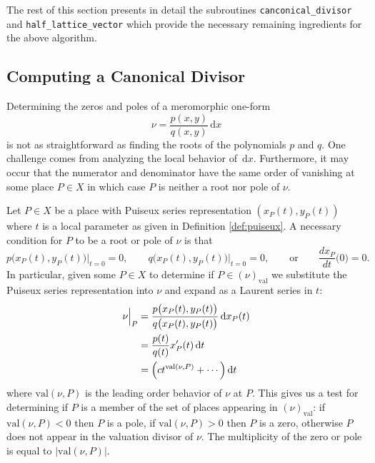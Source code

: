 \documentclass[12pt]{article}
\theoremstyle{definition}
\newcommand{\dx}{\,\mathrm{d}x}
\newcommand{\dt}{\,\mathrm{d}t}
\begin{document}
The rest of this section presents in detail the subroutines
\verb=canconical_divisor= and \verb=half_lattice_vector= which provide
the necessary remaining ingredients for the above algorithm.



\subsection{Computing a Canonical Divisor}\label{sec:canonical}



Determining the zeros and poles of a meromorphic one-form
\begin{equation} \label{eqn:meromorphic-one-form}
\nu = \frac{p(x,y)}{q(x,y)}\dx
\end{equation}
is not as straightforward as finding the roots of the polynomials $p$
and $q$. One challenge comes from analyzing the local behavior of
$\dx$. Furthermore, it may occur that the numerator and denominator have
the same order of vanishing at some place $P \in X$ in which case $P$ is
neither a root nor pole of $\nu$.

Let $P \in X$ be a place with Puiseux series representation $(x_P(t),
y_P(t))$ where $t$ is a local parameter as given in Definition
\ref{def:puiseux}. A necessary condition for $P$ to be a root or pole of
$\nu$ is that
\begin{equation}
  p\big(x_P(t), y_P(t)\big) \Big|_{t=0} \! = 0,
  \qquad
  q\big(x_P(t), y_P(t)\big) \Big|_{t=0} \! = 0,
  \qquad \text{or} \qquad
  \frac{dx_P}{dt}\big(0\big) = 0.
\end{equation}
In particular, given some $P \in X$ to determine if $P \in
(\nu)_\text{val}$ we substitute the Puiseux series representation into
$\nu$ and expand as a Laurent series in $t$:
\begin{align} \label{eqn:localization}
\nu \Big|_P
&=
\frac{p\big(x_P(t),y_P(t)\big)}{q\big(x_P(t),y_P(t)\big)} \dx_P(t) \notag \\
&=
\frac{p(t)}{q(t)} x_P'(t) \dt \notag \\
&=
\Big( c t^{\text{val}(\nu,P)} + \cdots \Big) \dt
\end{align}
where $\text{val}(\nu,P)$ is the leading order behavior of $\nu$ at
$P$. This gives us a test for determining if $P$ is a member of the set
of places appearing in $(\nu)_\text{val}$: if $\text{val}(\nu,P) < 0$
then $P$ is a pole, if $\text{val}(\nu,P) > 0$ then $P$ is a zero,
otherwise $P$ does not appear in the valuation divisor of $\nu$. The
multiplicity of the zero or pole is equal to $|\text{val}(\nu,P)|$.
\end{document}
